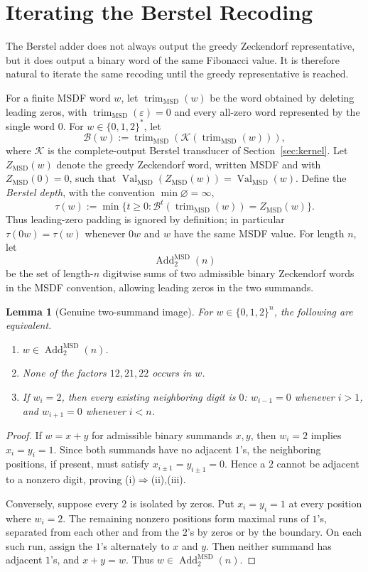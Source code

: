 \documentclass[11pt,letterpaper]{article}
\numberwithin{equation}{section}
\theoremstyle{plain}
\newtheorem{lemma}[theorem]{Lemma}
\theoremstyle{definition}
\theoremstyle{remark}
\DeclareMathOperator{\Val}{Val}
\newcommand{\AddTwo}{\operatorname{Add}_{2}}
\newcommand{\Berstel}{\mathcal{B}}
\newcommand{\trimMSD}{\operatorname{trim}_{\mathrm{MSD}}}
\begin{document}
\section{Iterating the Berstel Recoding}\label{sec:berstel-iteration}

The Berstel adder does not always output the greedy Zeckendorf representative,
but it does output a binary word of the same Fibonacci value.  It is therefore
natural to iterate the same recoding until the greedy representative is
reached.

For a finite MSDF word $w$, let $\trimMSD(w)$ be the word obtained by deleting
leading zeros, with $\trimMSD(\varepsilon)=0$ and every all-zero word
represented by the single word $0$.
For $w\in\{0,1,2\}^\ast$, let
\[
\Berstel(w):=\trimMSD(\mathcal K(\trimMSD(w))),
\]
where $\mathcal K$ is the complete-output Berstel transducer of
Section~\ref{sec:kernel}.  Let $Z_{\mathrm{MSD}}(w)$ denote the greedy
Zeckendorf word, written MSDF and with $Z_{\mathrm{MSD}}(0)=0$, such that
$\Val_{\mathrm{MSD}}(Z_{\mathrm{MSD}}(w))=\Val_{\mathrm{MSD}}(w)$.  Define the
\emph{Berstel depth}, with the convention $\min\varnothing=\infty$,
\[
\tau(w):=\min\{t\ge 0:\Berstel^t(\trimMSD(w))=Z_{\mathrm{MSD}}(w)\}.
\]
Thus leading-zero padding is ignored by definition; in particular
$\tau(0w)=\tau(w)$ whenever $0w$ and $w$ have the same MSDF value.
For length $n$, let
\[
\AddTwo^{\mathrm{MSD}}(n)
\]
be the set of length-$n$ digitwise sums of two admissible binary Zeckendorf
words in the MSDF convention, allowing leading zeros in the two summands.

\begin{lemma}[Genuine two-summand image]\label{lem:addtwo-msd-characterization}
For $w\in\{0,1,2\}^n$, the following are equivalent.
\begin{enumerate}[label=\textup{(\roman*)},leftmargin=*]
\item $w\in\AddTwo^{\mathrm{MSD}}(n)$.
\item None of the factors $12,21,22$ occurs in $w$.
\item If $w_i=2$, then every existing neighboring digit is $0$: $w_{i-1}=0$
whenever $i>1$, and $w_{i+1}=0$ whenever $i<n$.
\end{enumerate}
\end{lemma}

\begin{proof}
If $w=x+y$ for admissible binary summands $x,y$, then $w_i=2$ implies
$x_i=y_i=1$.  Since both summands have no adjacent $1$'s, the neighboring
positions, if present, must satisfy $x_{i\pm1}=y_{i\pm1}=0$.  Hence a $2$
cannot be adjacent to a nonzero digit, proving (i)$\Rightarrow$(ii),(iii).

Conversely, suppose every $2$ is isolated by zeros.  Put $x_i=y_i=1$ at every
position where $w_i=2$.  The remaining nonzero positions form maximal runs of
$1$'s, separated from each other and from the $2$'s by zeros or by the
boundary.  On each such run, assign the $1$'s alternately to $x$ and $y$.
Then neither summand has adjacent $1$'s, and $x+y=w$.  Thus
$w\in\AddTwo^{\mathrm{MSD}}(n)$.
\end{proof}
\end{document}
